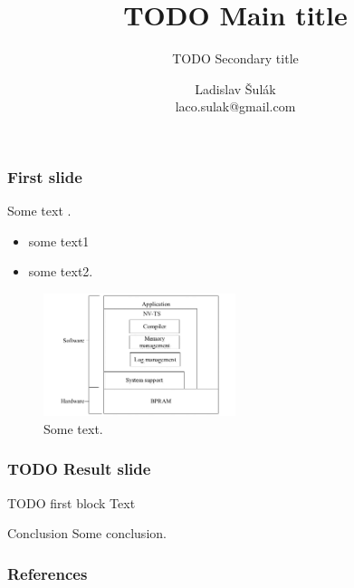 \documentclass[11pt,xcolor=pdflatex,dvipsnames,table]{beamer}
\title[TODO Title in page]{TODO Main title}
\subtitle{{\small TODO Secondary title}}
\author[Ladislav Šulák]
{
	Ladislav Šulák \\
	{\small laco.sulak@gmail.com} \\
}
\date[\today]{}
\institute[TODO institute]
\begin{document}
	\begin{frame}
		\titlepage
	\end{frame}

	\begin{frame}\frametitle{First slide}
			Some text \cite{SLR1, SLR2}. 
	\end{frame}

	\begin{frame}
		\begin{itemize}\setlength\itemsep{.4em}
			\item some text1
			\item some text2.
		\end{itemize}

		\begin{center}
			\begin{figure}[htbp]
 	 	  	\centering
   	 		\includegraphics[width=0.5\textwidth]{fig/architectureNVTS.png}
   	 		\caption{Some text.}
    		\label{fig:architecture}
			\end{figure}
		\end{center}
	
	\end{frame}
	

	\begin{frame}\frametitle{TODO Result slide}
	\begin{block}{TODO first block}
		Text
	\end{block}
	
	\begin{block}{Conclusion}
		Some conclusion.
	\end{block}

	\end{frame}
	
	\begin{frame}\frametitle{References}
		\fontsize{6.5pt}{7.2}\selectfont
	    
	\end{frame}
\end{document}
